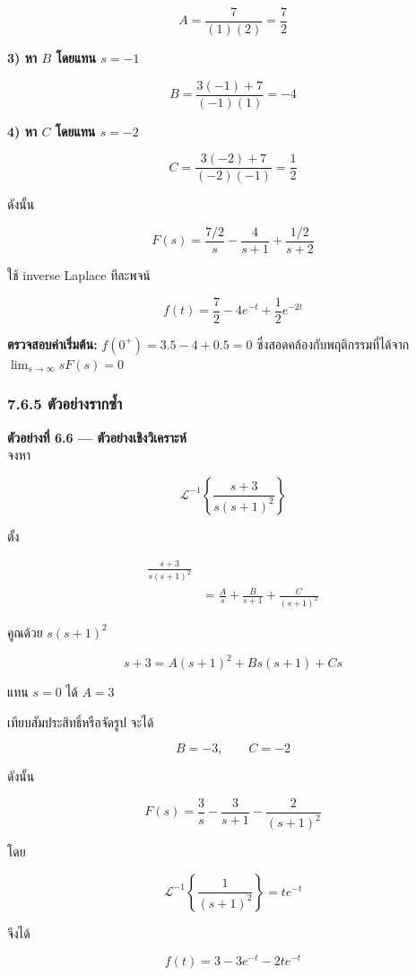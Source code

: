 \[
A=\frac{7}{(1)(2)}=\frac{7}{2}
\]

\textbf{3) หา $B$ โดยแทน $s=-1$}

\[
B=\frac{3(-1)+7}{(-1)(1)}=-4
\]

\textbf{4) หา $C$ โดยแทน $s=-2$}

\[
C=\frac{3(-2)+7}{(-2)(-1)}=\frac{1}{2}
\]

ดังนั้น

\[
F(s)=\frac{7/2}{s}-\frac{4}{s+1}+\frac{1/2}{s+2}
\]

ใช้ inverse Laplace ทีละพจน์

\[
\boxed{f(t)=\frac{7}{2}-4e^{-t}+\frac{1}{2}e^{-2t}}
\]

\textbf{ตรวจสอบค่าเริ่มต้น:} $f(0^+)=3.5-4+0.5=0$ ซึ่งสอดคล้องกับพฤติกรรมที่ได้จาก $\lim_{s\to\infty}sF(s)=0$

\subsubsection{7.6.5 ตัวอย่างรากซ้ำ}

\textbf{ตัวอย่างที่ 6.6 — ตัวอย่างเชิงวิเคราะห์}\\
จงหา

\[
\mathcal{L}^{-1}\left\{\frac{s+3}{s(s+1)^2}\right\}
\]

ตั้ง

\[
\begin{aligned}
    \frac{s+3}{s(s+1)^2}&\\
    &=\frac{A}{s}+\frac{B}{s+1}+\frac{C}{(s+1)^2}
\end{aligned}
\]

คูณด้วย $s(s+1)^2$

\[
s+3=A(s+1)^2+Bs(s+1)+Cs
\]

แทน $s=0$ ได้ $A=3$

เทียบสัมประสิทธิ์หรือจัดรูป จะได้

\[
B=-3,\qquad C=-2
\]

ดังนั้น

\[
F(s)=\frac{3}{s}-\frac{3}{s+1}-\frac{2}{(s+1)^2}
\]

โดย

\[
\mathcal{L}^{-1}\left\{\frac{1}{(s+1)^2}\right\}=te^{-t}
\]

จึงได้

\[
\boxed{f(t)=3-3e^{-t}-2te^{-t}}
\]

